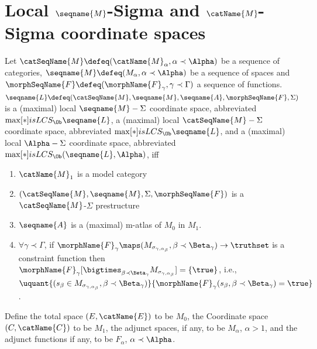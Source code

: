 \documentclass{article}
\begin{document}
\section{Local $\seqname{M}$-Sigma and \ensuremath{\catName{M}}-Sigma coordinate spaces}
\label{sec:lcs}
\begin{definition}
{
  \showlabelsinline
  \label{def:LCS}
}
Let $\catSeqName{M} \defeq (\catName{M}_\alpha, \alpha \prec \Alpha)$ be
a sequence of categories,
$\seqname{M} \defeq (M_\alpha, \alpha \prec \Alpha)$ be a
sequence of spaces and
$\morphSeqName{F} \defeq (\morphName{F}_\gamma, \gamma \prec \Gamma)$ a
sequence of functions.
$
  \seqname{L} \defeq
  (\catSeqName{M}, \seqname{M}, \seqname{A}, \morphSeqName{F}, \Sigma)
$
is a (maximal) local $\seqname{M}-\Sigma$ coordinate space, abbreviated
$\max[*]{isLCS_\Ob} \seqname{L}$, a (maximal) local
$\catSeqName{M}-\Sigma$ coordinate space, abbreviated
$\max[*]{isLCS_\Ob} \seqname{L}$, and a (maximal) local $\Alpha-\Sigma$
coordinate space, abbreviated $\max[*]{isLCS_\Ob}(\seqname{L},\Alpha)$,
iff

\begin{enumerate}
\item $\catName{M}_1$ is a model category

\item $(\catSeqName{M}, \seqname{M}, \Sigma, \morphSeqName{F})$ is a
$\catSeqName{M}$-$\Sigma$ prestructure

\item $\seqname{A}$ is a (maximal) m-atlas of $M_0$ in $M_1$.

\item $\forall \gamma \prec \Gamma$, if
$\morphName{F}_\gamma \maps (M_{\sigma_{\gamma,\alpha_\beta}}, \beta
\prec \Beta_\gamma) \to \truthset$ is a constraint function then \\
$\morphName{F}_\gamma
  [
    \bigtimes_{\beta \prec \Beta_\gamma}
    M_{\sigma_{\gamma,\alpha_\beta}}
  ]
= \{ \true \}$, i.e., \\
$\uquant
  {
    {
      (
        s_\beta \in M_{\sigma_{\gamma,\alpha_\beta}},
        \beta \prec \Beta_\gamma
      )
    }
  }
  {{\morphName{F}_\gamma(s_\beta, \beta \prec \Beta_\gamma) = \true}}
  $.
\end{enumerate}

Define the total space $(E, \catName{E})$ to be $M_0$, the Coordinate
space $(C,\catName{C})$ to be $M_1$, the adjunct spaces, if any, to be
$M_\alpha$, $\alpha >1$, and the adjunct functions if any, to be
$F_\alpha$, $\alpha \prec \Alpha$.
\end{definition}
\end{document}
